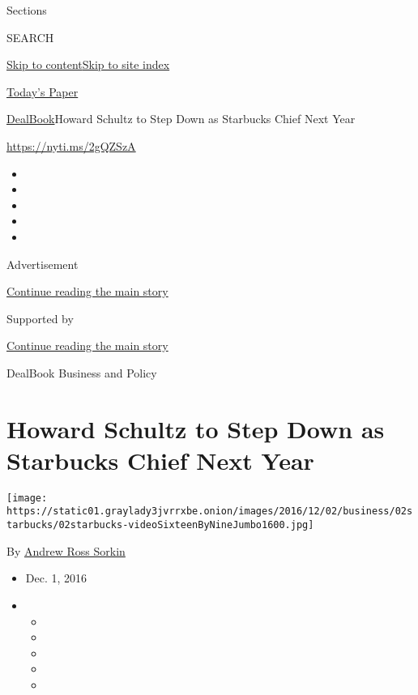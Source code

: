 Sections

SEARCH

\protect\hyperlink{site-content}{Skip to
content}\protect\hyperlink{site-index}{Skip to site index}

\href{https://myaccount.nytimes3xbfgragh.onion/auth/login?response_type=cookie\&client_id=vi}{}

\href{https://www.nytimes3xbfgragh.onion/section/todayspaper}{Today's
Paper}

\href{/section/business/dealbook}{DealBook}\textbar{}Howard Schultz to
Step Down as Starbucks Chief Next Year

\url{https://nyti.ms/2gQZSzA}

\begin{itemize}
\item
\item
\item
\item
\item
\end{itemize}

Advertisement

\protect\hyperlink{after-top}{Continue reading the main story}

Supported by

\protect\hyperlink{after-sponsor}{Continue reading the main story}

DealBook Business and Policy

\hypertarget{howard-schultz-to-step-down-as-starbucks-chief-next-year}{%
\section{Howard Schultz to Step Down as Starbucks Chief Next
Year}\label{howard-schultz-to-step-down-as-starbucks-chief-next-year}}

\texttt{[image: https://static01.graylady3jvrrxbe.onion/images/2016/12/02/business/02starbucks/02starbucks-videoSixteenByNineJumbo1600.jpg]}

By \href{http://www.nytimes3xbfgragh.onion/by/andrew-ross-sorkin}{Andrew
Ross Sorkin}

\begin{itemize}
\item
  Dec. 1, 2016
\item
  \begin{itemize}
  \item
  \item
  \item
  \item
  \item
  \end{itemize}
\end{itemize}

